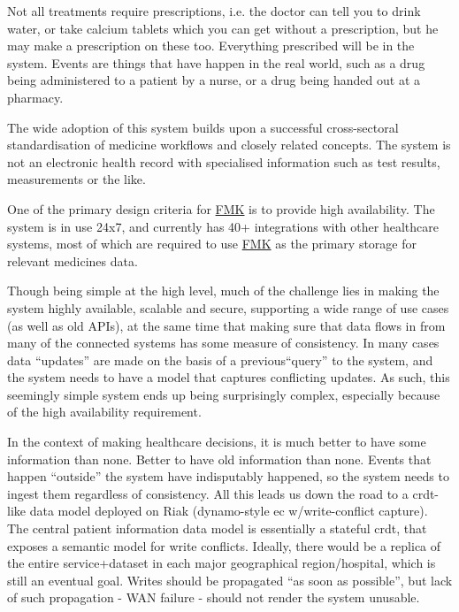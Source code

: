 Not all treatments require prescriptions, i.e. the doctor can tell you to drink water, or take calcium tablets which you can get without a prescription, but he may make a prescription on these too. Everything prescribed will be in the system. Events are things that have happen in the real world, such as a drug being administered to a patient by a nurse, or a drug being handed out at a pharmacy. 

The wide adoption of this system builds upon a successful cross-sectoral standardisation of medicine workflows and closely related concepts. The system is not an electronic health record with specialised information such as test results, measurements or the like.

One of the primary design criteria for \href{https://www.trifork.com/news/a-prestigious-prize-trifork-public}{FMK} is to provide high availability. The system is in use 24x7, and currently has 40+ integrations with other healthcare systems, most of which are required to use \href{https://www.trifork.com/news/a-prestigious-prize-trifork-public}{FMK} as the primary storage for relevant medicines data. 

Though being simple at the high level, much of the challenge lies in making the system highly available, scalable and secure, supporting a wide range of use cases (as well as old APIs), at the same time that making sure that data flows in from many of the connected systems has some measure of consistency. In many cases data \textquotedblleft updates\textquotedblright{} are made on the basis of a previous\textquotedblleft query\textquotedblright{} to the system, and the system needs to have a model that captures conflicting updates. As such, this seemingly simple system ends up being surprisingly complex, especially because of the high availability requirement. 

In the context of making healthcare decisions, it is much better to have some information than none. Better to have old information than none. Events that happen \textquotedblleft outside\textquotedblright{} the system have indisputably happened, so the system needs to ingest them regardless of consistency. All this leads us down the road to a \gls{crdt}-like data model deployed on Riak (dynamo-style \gls{ec} w/write-conflict capture). The central patient information data model is essentially a stateful \gls{crdt}, that exposes a semantic model for write conflicts. Ideally, there would be a replica of the entire service+dataset in each major geographical region/hospital, which is still an eventual goal. Writes should be propagated \textquotedblleft as soon as possible\textquotedblright , but lack of such propagation - WAN failure - should not render the system unusable.


